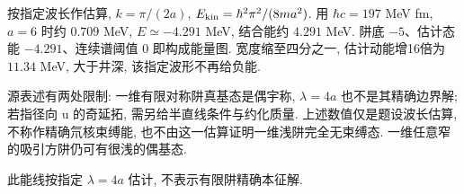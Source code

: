 \begin{solution}
按指定波长作估算, $k=\pi/(2a)$, $E_{\rm kin}=\hbar^2\pi^2/(8ma^2)$. 用 $\hbar c=197$ MeV fm, $a=6$ 时约 $0.709$ MeV, $E\simeq-4.291$ MeV, 结合能约 $4.291$ MeV. 阱底 $-5$、估计态能 $-4.291$、连续谱阈值 $0$ 即构成能量图. 宽度缩至四分之一, 估计动能增16倍为 $11.34$ MeV, 大于井深, 该指定波形不再给负能.

源表述有两处限制: 一维有限对称阱真基态是偶宇称, $\lambda=4a$ 也不是其精确边界解; 若指径向 u 的奇延拓, 需另给半直线条件与约化质量. 上述数值仅是题设波长估算, 不称作精确氘核束缚能, 也不由这一估算证明一维浅阱完全无束缚态. 一维任意窄的吸引方阱仍可有很浅的偶基态.

\begin{center}\end{center}
此能线按指定 $\lambda=4a$ 估计, 不表示有限阱精确本征解.
\end{solution}
